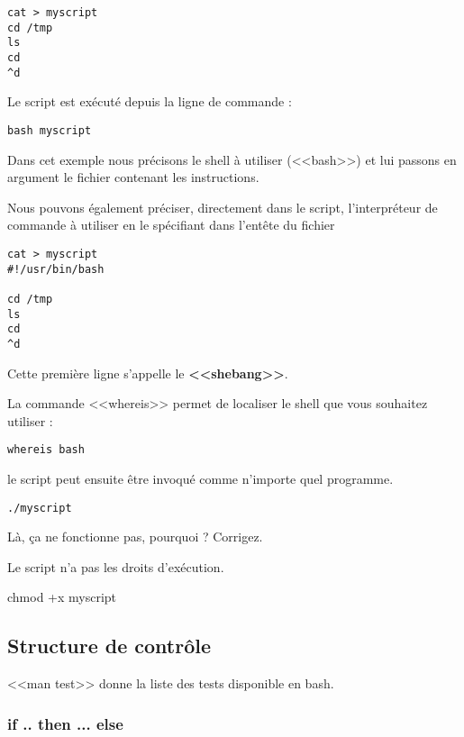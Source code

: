\documentclass[11pt]{article}
\begin{document}
\begin{lstlisting}
cat > myscript
cd /tmp
ls
cd
^d
\end{lstlisting}

Le script est exécuté depuis la ligne de commande :

\begin{lstlisting}
bash myscript
\end{lstlisting}

Dans cet exemple nous précisons le shell à utiliser (<<bash>>) et lui passons en argument le fichier contenant les instructions.

Nous pouvons également préciser, directement dans le script, l'interpréteur de commande à utiliser en le spécifiant dans l'entête du fichier

\begin{lstlisting}
cat > myscript
#!/usr/bin/bash

cd /tmp
ls
cd
^d
\end{lstlisting}

Cette première ligne s'appelle le \textbf{<<shebang>>}.

La commande <<whereis>> permet de localiser le shell que vous souhaitez utiliser :

\begin{lstlisting}
whereis bash
\end{lstlisting}

le script peut ensuite être invoqué comme n'importe quel programme.

\begin{lstlisting}
./myscript
\end{lstlisting}

Là, ça ne fonctionne pas, pourquoi ? Corrigez.

\begin{solution}
Le script n'a pas les droits d'exécution.

chmod +x myscript
\end{solution}

\subsection{Structure de contrôle}

<<man test>> donne la liste des tests disponible en bash.

\subsubsection{if .. then ... else}
\end{document}
